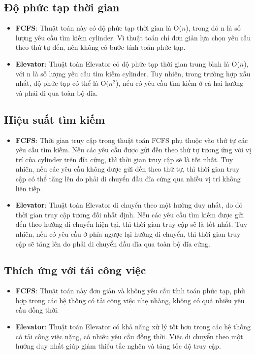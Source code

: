 \documentclass{report}
\begin{document}
        \subsection{Độ phức tạp thời gian}
            \begin{itemize}
                \item \textbf{FCFS}: Thuật toán này có độ phức tạp thời gian là O(\(n\)), trong đó n là số lượng yêu cầu tìm kiếm cylinder. Vì thuật toán chỉ đơn giản lựa chọn yêu cầu theo thứ tự đến, nên không có bước tính toán phức tạp.
    
                \item \textbf{Elevator}: Thuật toán Elevator có độ phức tạp thời gian trung bình là O(\(n\)), với n là số lượng yêu cầu tìm kiếm cylinder. Tuy nhiên, trong trường hợp xấu nhất, độ phức tạp có thể là O(\(n^2\)), nếu có yêu cầu tìm kiếm ở cả hai hướng và phải đi qua toàn bộ đĩa.
                
            \end{itemize}
    
    
        \subsection{Hiệu suất tìm kiếm}
            \begin{itemize}
                \item \textbf{FCFS}: Thời gian truy cập trong thuật toán FCFS phụ thuộc vào thứ tự các yêu cầu tìm kiếm. Nếu các yêu cầu được gửi đến theo thứ tự tương ứng với vị trí của cylinder trên đĩa cứng, thì thời gian truy cập sẽ là tốt nhất. Tuy nhiên, nếu các yêu cầu không được gửi đến theo thứ tự, thì thời gian truy cập có thể tăng lên do phải di chuyển đầu đĩa cứng qua nhiều vị trí không liên tiếp.
                \item \textbf{Elevator}: Thuật toán Elevator di chuyển theo một hướng duy nhất, do đó thời gian truy cập tương đối nhất định. Nếu các yêu cầu tìm kiếm được gửi đến theo hướng di chuyển hiện tại, thì thời gian truy cập sẽ là tốt nhất. Tuy nhiên, nếu có yêu cầu ở phía ngược lại hướng di chuyển, thì thời gian truy cập sẽ tăng lên do phải di chuyển đầu đĩa qua toàn bộ đĩa cứng.

            \end{itemize}
        
        \subsection{Thích ứng với tải công việc}
            \begin{itemize}
                \item \textbf{FCFS}: Thuật toán này đơn giản và không yêu cầu tính toán phức tạp, phù hợp trong các hệ thống có tải công việc nhẹ nhàng, không có quá nhiều yêu cầu đồng thời.
                \item \textbf{Elevator}: Thuật toán Elevator có khả năng xử lý tốt hơn trong các hệ thống có tải công việc nặng, có nhiều yêu cầu đồng thời. Việc di chuyển theo một hướng duy nhất giúp giảm thiểu tắc nghẽn và tăng tốc độ truy cập.
            \end{itemize}
            
\end{document}
